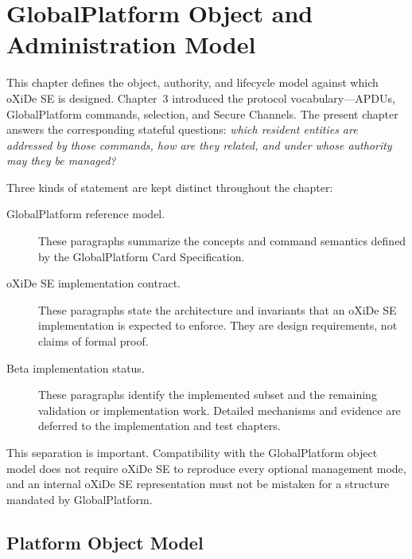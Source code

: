 \chapter{GlobalPlatform Object and Administration Model}

This chapter defines the object, authority, and lifecycle model against which
oXiDe SE is designed. Chapter~3 introduced the protocol vocabulary---APDUs,
GlobalPlatform commands, selection, and Secure Channels. The present chapter
answers the corresponding stateful questions: \emph{which resident entities
are addressed by those commands, how are they related, and under whose
authority may they be managed?}

Three kinds of statement are kept distinct throughout the chapter:

\begin{description}
\item[GlobalPlatform reference model.] These paragraphs summarize the
      concepts and command semantics defined by the GlobalPlatform Card
      Specification.
\item[oXiDe SE implementation contract.] These paragraphs state the
      architecture and invariants that an oXiDe SE implementation is expected
      to enforce. They are design requirements, not claims of formal proof.
\item[Beta implementation status.] These paragraphs identify the implemented
      subset and the remaining validation or implementation work. Detailed
      mechanisms and evidence are deferred to the implementation and test
      chapters.
\end{description}

This separation is important. Compatibility with the GlobalPlatform object
model does not require oXiDe SE to reproduce every optional management mode,
and an internal oXiDe SE representation must not be mistaken for a structure
mandated by GlobalPlatform.

\section{Platform Object Model}
\label{sec:gp-object-model}


